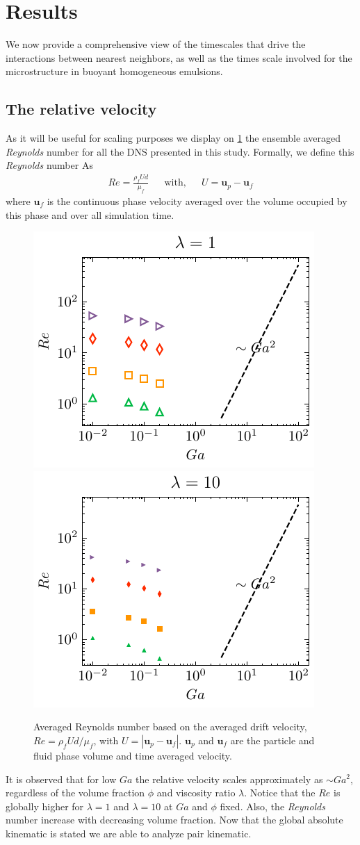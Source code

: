 \section{Results}
\label{sec:results}

We now provide a comprehensive view of the timescales that drive the interactions between nearest neighbors, as well as the times scale involved for the microstructure in buoyant homogeneous emulsions.

\subsection{The relative velocity}

As it will be useful for scaling purposes we display on \ref{fig:Reall} the ensemble averaged \textit{Reynolds} number for all the DNS presented in this study.
Formally, we define this \textit{Reynolds} number As
\begin{align*}
    Re = \frac{\rho_f U d}{\mu_f} && \text{with}, && U = \textbf{u}_p - \textbf{u}_f
\end{align*}
where $\textbf{u}_f$ is the continuous phase velocity averaged over the volume occupied by this phase and over all simulation time. 
\begin{figure}[h!]
    \centering
    \includegraphics[height = 0.3\textwidth]{image/HOMOGENEOUS_NEW/CA/Re_l_1.pdf}
    \includegraphics[height = 0.3\textwidth]{image/HOMOGENEOUS_NEW/CA/Re_l_10.pdf}
    \caption{
        Averaged Reynolds number based on the averaged drift velocity, $Re = \rho_fU d /\mu_f$, with $U = |\textbf{u}_p - \textbf{u}_f|$.
        $\textbf{u}_p$ and $\textbf{u}_f$ are the particle and fluid phase volume and time averaged velocity.
    }
    \label{fig:Reall}
\end{figure}
It is observed that for low $Ga$ the relative velocity scales approximately as $\sim Ga^2$, regardless of the volume fraction $\phi$ and viscosity ratio $\lambda$. 
Notice that the $Re$ is globally higher for $\lambda  =1$ and $\lambda = 10$ at $Ga$ and $\phi$ fixed. 
Also, the \textit{Reynolds} number increase with decreasing volume fraction. 
Now that the global absolute kinematic is stated we are able to analyze pair kinematic. 

